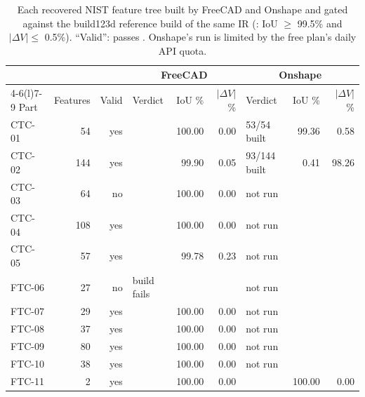 \begin{table}[t]
\centering\small
\begin{tabular}{@{}lrrlrrlrr@{}}
\toprule
& & & \multicolumn{3}{c}{FreeCAD} & \multicolumn{3}{c}{Onshape} \\
\cmidrule(lr){4-6}\cmidrule(l){7-9}
Part & Features & Valid & Verdict & IoU \% & $|\Delta V|$ \% & Verdict & IoU \% & $|\Delta V|$ \% \\
\midrule
CTC-01 & 54 & yes & \VERIFIED{} & 100.00 & 0.00 & 53/54 built & 99.36 & 0.58 \\
CTC-02 & 144 & yes & \VERIFIED{} & 99.90 & 0.05 & 93/144 built & 0.41 & 98.26 \\
CTC-03 & 64 & no & \VERIFIED{} & 100.00 & 0.00 & not run &  &  \\
CTC-04 & 108 & yes & \VERIFIED{} & 100.00 & 0.00 & not run &  &  \\
CTC-05 & 57 & yes & \VERIFIED{} & 99.78 & 0.23 & not run &  &  \\
FTC-06 & 27 & no & build fails &  &  & not run &  &  \\
FTC-07 & 29 & yes & \VERIFIED{} & 100.00 & 0.00 & not run &  &  \\
FTC-08 & 37 & yes & \VERIFIED{} & 100.00 & 0.00 & not run &  &  \\
FTC-09 & 80 & yes & \VERIFIED{} & 100.00 & 0.00 & not run &  &  \\
FTC-10 & 38 & yes & \VERIFIED{} & 100.00 & 0.00 & not run &  &  \\
FTC-11 & 2 & yes & \VERIFIED{} & 100.00 & 0.00 & \VERIFIED{} & 100.00 & 0.00 \\
\bottomrule
\end{tabular}
\caption{Each recovered NIST feature tree built by FreeCAD and Onshape and gated against the build123d reference build of the same IR (\VERIFIED{}: IoU $\geq$ 99.5\% and $|\Delta V| \leq$ 0.5\%). ``Valid'': passes . Onshape's run is limited by the free plan's daily API quota.}
\label{tab:corpus}
\end{table}

